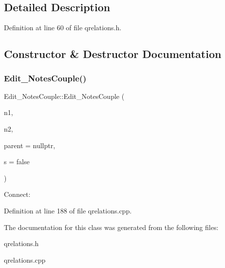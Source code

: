 \subsection{Detailed Description}


Definition at line 60 of file qrelations.\+h.



\subsection{Constructor \& Destructor Documentation}
\mbox{\label{class_edit___notes_couple_aa0780f3a53175747c5a7136d4f2ffa30}} 
\subsubsection{\texorpdfstring{Edit\+\_\+\+Notes\+Couple()}{Edit\_NotesCouple()}}
{\footnotesize\ttfamily Edit\+\_\+\+Notes\+Couple\+::\+Edit\+\_\+\+Notes\+Couple (\begin{DoxyParamCaption}\item[{\hyperlink{class_note}{Note} $\ast$}]{n1,  }\item[{\hyperlink{class_note}{Note} $\ast$}]{n2,  }\item[{Q\+Widget $\ast$}]{parent = {\ttfamily nullptr},  }\item[{bool}]{s = {\ttfamily false} }\end{DoxyParamCaption})}

Connect\+: 

Definition at line 188 of file qrelations.\+cpp.



The documentation for this class was generated from the following files\+:\begin{DoxyCompactItemize}
\item 
qrelations.\+h\item 
qrelations.\+cpp\end{DoxyCompactItemize}
